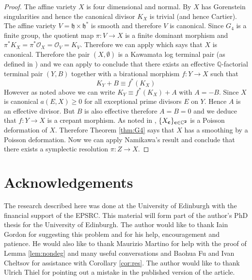 \documentclass[a4apper,10pt]{amsart}
\theoremstyle{definition}
\numberwithin{thm}{section}
\newcommand{\Q}{\mathbb{Q}}
\newcommand{\C}{\mathbb{C}}
\begin{document}
\begin{proof}
The affine variety $X$ is four dimensional and normal. By \cite[Watanabe's Theorem]{15} $X$ has Gorenstein singularities and hence the canonical divisor $K_X$ is trivial (and hence Cartier). The affine variety $V = \mathfrak{h} \times \mathfrak{h}^*$ is smooth and therefore $V$ is canonical. Since $G_4$ is a finite group, the quotient map $\pi : V \rightarrow X$ is a finite dominant morphism and $\pi^* K_X = \pi^* \mathcal{O}_X = \mathcal{O}_V = K_V$. Therefore we can apply \cite[Proposition 3.16]{18} which says that $X$ is canonical. Therefore the pair $(X,\emptyset)$ is a Kawamata log terminal pair (as defined in \cite{16}) and we can apply \cite[Lemma 2.1]{16} to conclude that there exists an effective $\Q$-factorial terminal pair $(Y,B)$ together with a birational morphism $f : Y \rightarrow X$ such that 
\begin{displaymath}
K_Y + B \equiv f^* (K_X)
\end{displaymath}
However as noted above we can write $K_Y \equiv f^*(K_X) + A$ with $A = - B$. Since $X$ is canonical $a(E,X) \ge 0$ for all exceptional prime divisors $E$ on $Y$. Hence $A$ is an effective divisor. But $B$ is also effective therefore $A = B = 0$ and we deduce that $f : Y \rightarrow X$ is a crepant morphism. As noted in \cite[Section 4.14]{1}, $\{ X_{\bf{c}} \}_{\bf{c} \in \C^2}$ is a Poisson deformation of $X$. Therefore Theorem \ref{thm:G4} says that $X$ has a smoothing by a Poisson deformation. Now we can apply Namikawa's result \cite[Theorem 2.4]{9} and conclude that there exists a symplectic resolution $\pi : Z \rightarrow X$.
\end{proof}

\section{Acknowledgements}

The research described here was done at the University of Edinburgh with the financial support of the EPSRC. This material will form part of the author's PhD thesis for the University of Edinburgh. The author would like to thank Iain Gordon for suggesting this problem and for his help, encouragement and patience. He would also like to thank Maurizio Martino for help with the proof of Lemma \ref{lem:nondeg} and many useful conversations and Baohua Fu and Ivan Cheltsov for assistance with Corollary \ref{cor:res}. The author would like to thank Ulrich Thiel for pointing out a mistake in the published version of the article. 
\end{document}
